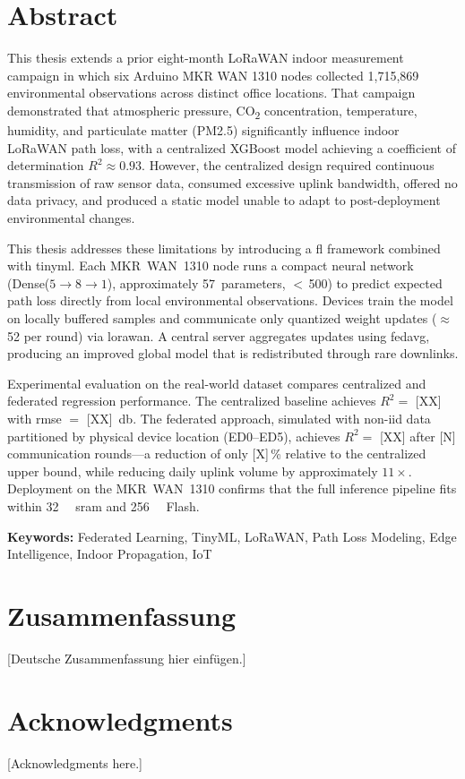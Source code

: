 \chapter*{Abstract}


This thesis extends a prior eight-month LoRaWAN indoor measurement campaign in which six
Arduino MKR WAN 1310 nodes collected 1,715,869 environmental observations across distinct
office locations. That campaign demonstrated that atmospheric pressure, CO\textsubscript{2}
concentration, temperature, humidity, and particulate matter (PM2.5) significantly influence
indoor LoRaWAN path loss, with a centralized XGBoost model achieving a coefficient of
determination $R^2 \approx 0.93$. However, the centralized design required continuous
transmission of raw sensor data, consumed excessive uplink bandwidth, offered no data
privacy, and produced a static model unable to adapt to post-deployment environmental
changes.

This thesis addresses these limitations by introducing a \gls{fl} framework combined with
\gls{tinyml}. Each MKR~WAN~1310 node runs a compact neural network
(Dense($5 \!\to\! 8 \!\to\! 1$), approximately 57~parameters,
$<$\,\SI{500}{\byte}) to predict expected path loss directly from local
environmental observations. Devices train the model on locally buffered samples and
communicate only quantized weight updates ($\approx$\,\SI{52}{\byte} per round) via
\gls{lorawan}. A central server aggregates updates using \gls{fedavg}, producing an
improved global model that is redistributed through rare downlinks.

Experimental evaluation on the real-world dataset compares centralized and federated
regression performance. The centralized baseline achieves $R^2 = $ [XX] with \gls{rmse}
$=$ \SI{[XX]}{\decibel}. The federated approach, simulated with non-\gls{iid} data
partitioned by physical device location (ED0--ED5), achieves $R^2 = $ [XX] after [N]
communication rounds---a reduction of only [X]\,\% relative to the centralized upper bound,
while reducing daily uplink volume by approximately $11\times$. Deployment on the
MKR~WAN~1310 confirms that the full inference pipeline fits within \SI{32}{\kilo\byte}
\gls{sram} and \SI{256}{\kilo\byte} Flash.

\noindent\textbf{Keywords:} Federated Learning, TinyML, LoRaWAN, Path Loss Modeling,
Edge Intelligence, Indoor Propagation, IoT

\clearpage

\chapter*{Zusammenfassung}
[Deutsche Zusammenfassung hier einf\"ugen.]
\clearpage

\chapter*{Acknowledgments}
[Acknowledgments here.]
\clearpage
